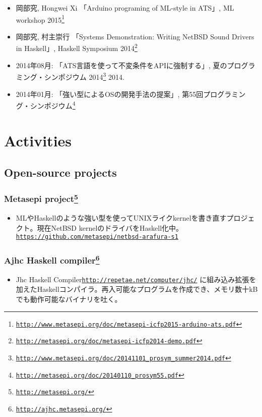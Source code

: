 \documentclass[letterpaper]{article}
\begin{document}
\begin{itemize}
  \item 岡部究, Hongwei Xi 「Arduino programing of ML-style in ATS」, ML workshop 2015\footnote{\href{http://www.metasepi.org/doc/metasepi-icfp2015-arduino-ats.pdf}{\tt http://www.metasepi.org/doc/metasepi-icfp2015-arduino-ats.pdf}}
  \item 岡部究, 村主崇行 「Systems Demonstration: Writing NetBSD Sound Drivers in Haskell」, Haskell Symposium 2014\footnote{\href{http://metasepi.org/doc/metasepi-icfp2014-demo.pdf}{\tt http://metasepi.org/doc/metasepi-icfp2014-demo.pdf}}
  \item 2014年08月: 「ATS言語を使って不変条件をAPIに強制する」, 夏のプログラミング・シンポジウム 2014\footnote{\href{http://www.metasepi.org/doc/20141101\_prosym\_summer2014.pdf}{\tt http://www.metasepi.org/doc/20141101\_prosym\_summer2014.pdf}}  2014.
  \item 2014年01月: 「強い型によるOSの開発手法の提案」, 第55回プログラミング・シンポジウム\footnote{\href{http://metasepi.org/doc/20140110\_prosym55.pdf}{\tt http://metasepi.org/doc/20140110\_prosym55.pdf}}
\end{itemize}

\section*{Activities}

\subsection*{Open-source projects}

\subsubsection*{Metasepi project\footnote{\href{http://metasepi.org/}{\tt http://metasepi.org/}}}
\begin{itemize}
\item MLやHaskellのような強い型を使ってUNIXライクkernelを書き直すプロジェクト。現在NetBSD kernelのドライバをHaskell化中。 \href{https://github.com/metasepi/netbsd-arafura-s1}{\tt https://github.com/metasepi/netbsd-arafura-s1}
\end{itemize}

\subsubsection*{Ajhc Haskell compiler\footnote{\href{http://ajhc.metasepi.org/}{\tt http://ajhc.metasepi.org/}}}
\begin{itemize}
\item Jhc Haskell Compiler\href{http://repetae.net/computer/jhc/}{\tt http://repetae.net/computer/jhc/} に組み込み拡張を加えたHaskellコンパイラ。再入可能なプログラムを作成でき、メモリ数十kBでも動作可能なバイナリを吐く。
\end{itemize}
\end{document}
